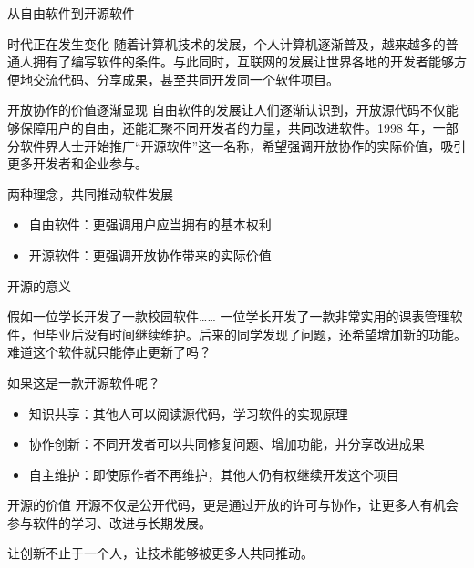 \documentclass[aspectratio=169]{beamer}
\begin{document}
\begin{frame}{从自由软件到开源软件}
	\begin{block}{时代正在发生变化}
		\hspace*{2em}随着计算机技术的发展，个人计算机逐渐普及，越来越多的普通人拥有了编写软件的条件。与此同时，互联网的发展让世界各地的开发者能够方便地交流代码、分享成果，甚至共同开发同一个软件项目。
	\end{block}
	\begin{block}{开放协作的价值逐渐显现}
		\hspace*{2em}自由软件的发展让人们逐渐认识到，开放源代码不仅能够保障用户的自由，还能汇聚不同开发者的力量，共同改进软件。1998 年，一部分软件界人士开始推广“开源软件”这一名称，希望强调开放协作的实际价值，吸引更多开发者和企业参与。
	\end{block}
	\begin{block}{两种理念，共同推动软件发展}
		\begin{itemize}
			\item 自由软件：更强调用户应当拥有的基本权利
			\item 开源软件：更强调开放协作带来的实际价值
		\end{itemize}
	\end{block}
\end{frame}

\begin{frame}{开源的意义}
	\begin{block}{假如一位学长开发了一款校园软件……}
		\hspace*{2em}一位学长开发了一款非常实用的课表管理软件，但毕业后没有时间继续维护。后来的同学发现了问题，还希望增加新的功能。难道这个软件就只能停止更新了吗？
	\end{block}
	\begin{block}{如果这是一款开源软件呢？}
		\begin{itemize}
			\item 知识共享：其他人可以阅读源代码，学习软件的实现原理
			\item 协作创新：不同开发者可以共同修复问题、增加功能，并分享改进成果
			\item 自主维护：即使原作者不再维护，其他人仍有权继续开发这个项目
		\end{itemize}
	\end{block}
	\begin{block}{开源的价值}
		\hspace*{2em}开源不仅是公开代码，更是通过开放的许可与协作，让更多人有机会参与软件的学习、改进与长期发展。
		\par\hspace*{2em}\alert{让创新不止于一个人，让技术能够被更多人共同推动。}
	\end{block}
\end{frame}
\end{document}
